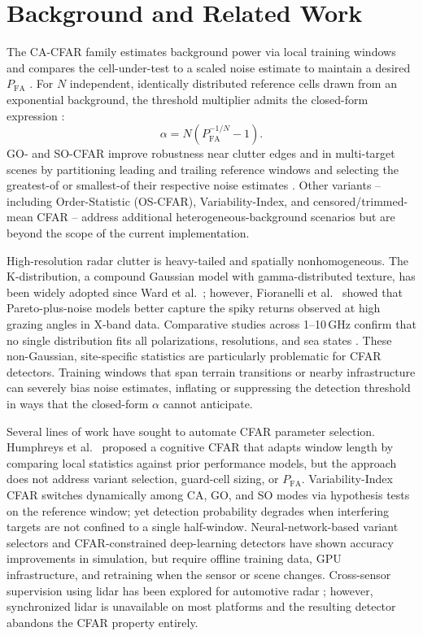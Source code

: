 \documentclass[conf]{new-aiaa}
\begin{document}
\section{Background and Related Work}
The CA-CFAR family estimates background power via local training windows and compares the cell-under-test to a scaled noise estimate to maintain a desired $P_{\mathrm{FA}}$ \cite{finn1968, gandhi1988}. For $N$ independent, identically distributed reference cells drawn from an exponential background, the threshold multiplier admits the closed-form expression \cite{richards2005, finn1968}:
\begin{equation}
    \alpha = N\!\left(P_{\mathrm{FA}}^{-1/N} - 1\right). \label{eq:alpha}
\end{equation}
GO- and SO-CFAR improve robustness near clutter edges and in multi-target scenes by partitioning leading and trailing reference windows and selecting the greatest-of or smallest-of their respective noise estimates \cite{hansen1972, trunk1978}. Other variants -- including Order-Statistic (OS-CFAR), Variability-Index, and censored/trimmed-mean CFAR -- address additional heterogeneous-background scenarios \cite{farina2005review} but are beyond the scope of the current implementation.

High-resolution radar clutter is heavy-tailed and spatially nonhomogeneous. The K-distribution, a compound Gaussian model with gamma-distributed texture, has been widely adopted since Ward et al.\ \cite{ward2006}; however, Fioranelli et al.\ \cite{fioranelli2014} showed that Pareto-plus-noise models better capture the spiky returns observed at high grazing angles in X-band data. Comparative studies across 1--10\,GHz confirm that no single distribution fits all polarizations, resolutions, and sea states \cite{dong2019}. These non-Gaussian, site-specific statistics are particularly problematic for CFAR detectors. Training windows that span terrain transitions or nearby infrastructure can severely bias noise estimates, inflating or suppressing the detection threshold in ways that the closed-form $\alpha$ cannot anticipate.

Several lines of work have sought to automate CFAR parameter selection. Humphreys et al.\ \cite{humphreys2022} proposed a cognitive CFAR that adapts window length by comparing local statistics against prior performance models, but the approach does not address variant selection, guard-cell sizing, or $P_{\mathrm{FA}}$. Variability-Index CFAR \cite{vicfar2014} switches dynamically among CA, GO, and SO modes via hypothesis tests on the reference window; yet detection probability degrades when interfering targets are not confined to a single half-window. Neural-network-based variant selectors \cite{nncfar2019} and CFAR-constrained deep-learning detectors \cite{cfarnet2024} have shown accuracy improvements in simulation, but require offline training data, GPU infrastructure, and retraining when the sensor or scene changes. Cross-sensor supervision using lidar has been explored for automotive radar \cite{seefurther2024}; however, synchronized lidar is unavailable on most platforms and the resulting detector abandons the CFAR property entirely.
\end{document}
